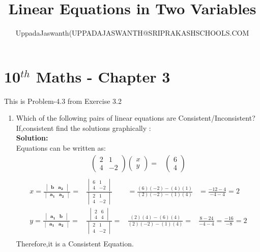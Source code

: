 \documentclass[12pt]{article}
\title{Linear Equations in Two Variables}
\author{UppadaJaswanth(UPPADAJASWANTH@SRIPRAKASHSCHOOLS.COM}
\newcommand{\myvec}[1]{\ensuremath{\begin{pmatrix}#1\end{pmatrix}}}
\newcommand{\mydet}[1]{\ensuremath{\begin{vmatrix}#1\end{vmatrix}}}
\newcommand{\solution}{\noindent \textbf{Solution: }}
\let\vec\mathbf
\begin{document}
\maketitle
\section*{10$^{th}$ Maths - Chapter 3}
This is Problem-4.3 from Exercise 3.2
\begin{enumerate}
\item Which of the following pairs of linear equations are Consistent/Inconsistent?If,consistent find the solutions graphically : \\
\solution \\
Equations can be written as:
\begin{align}
\myvec{2&1\\4&-2}\myvec{x\\y}=&\myvec{6\\4}\\
\end{align}
\begin{align}
x=\frac{\mydet{\vec{b}&\vec{a_2}}}{\mydet{\vec{a_1}&\vec{a_2}}} =&
\frac{\mydet{6&1\\4&-2}}{\mydet{2&1\\4&-2}}&=
\frac{(6)(-2)-(4)(1)}{(2)(-2)-(1)(4)}&=
\frac{-12-4}{-4-4}=
2\\
y=\frac{\mydet{\vec{a_1}&\vec{b}}}{\mydet{\vec{a_1}&\vec{a_2}}} =&
\frac{\mydet{ 2 & 6 \\ 4 & 4 }}{\mydet{ 2 & 1\\4 & -2}}=&
\frac{(2)(4)-(6)(4)}{(2)(-2)-(1)(4)}=&
\frac{8-24}{-4-4}=
\frac{-16}{-8}=2\\
\end{align}
Therefore,it is a Consistent Equation.







\end{enumerate}
\end{document}
